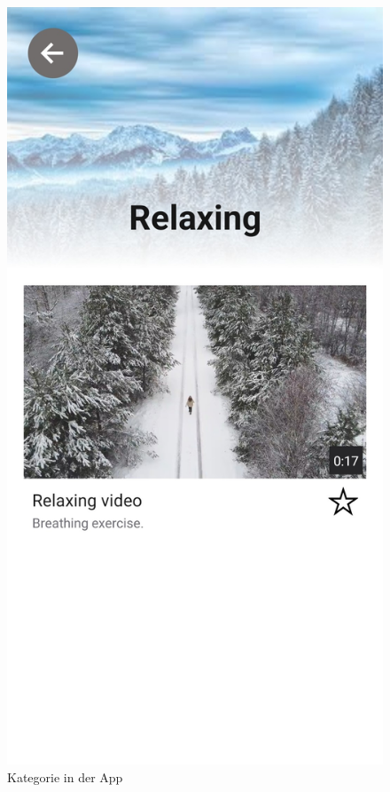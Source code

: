 \begin{figure}[H]
\begin{minipage}{0.5\textwidth}
    \end{minipage}
    \begin{minipage}{0.5\textwidth}
        \centering
        \includegraphics[height=2\textwidth]{./pics/Kategorie.jpg}
        \caption{Kategorie in der App}
    \end{minipage}
\end{figure}

